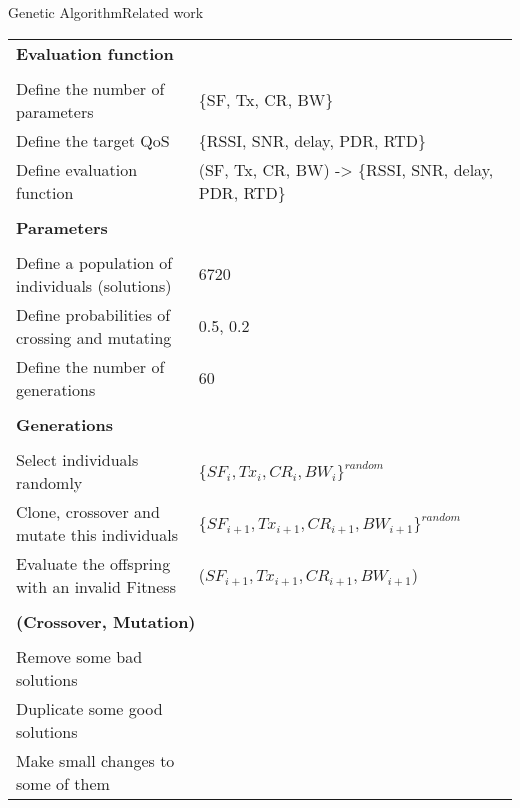 \begin{frame}{Genetic Algorithm}{Related work}
		\begin{tabular}{ll}
			\multicolumn{2}{l}{\textbf{Evaluation function}} \\\\
			Define the number of parameters                       	& \{SF, Tx, CR, BW\} \\
			Define the target QoS			                      	& \{RSSI, SNR, delay, PDR, RTD\} \\
			Define evaluation function                            	& \red{Score}(SF, Tx, CR, BW) -> \{RSSI, SNR, delay, PDR, RTD\} \\\\
			\multicolumn{2}{l}{\textbf{Parameters}} \\\\
			Define a population of individuals (solutions)      	& 6720  \\
			Define probabilities of crossing and mutating       	& 0.5, 0.2 \\ 
			Define the number of generations                   	 	& 60 \\\\
			\multicolumn{2}{l}{\textbf{Generations}} \\\\
			Select individuals randomly    							& \{$SF_{i}, Tx_{i}, CR_{i}, BW_{i}\}^{random}$ 	\\
			Clone, crossover and mutate this individuals 	        & \{$SF_{i+1}, Tx_{i+1}, CR_{i+1}, BW_{i+1}\}^{random}$ \\
			Evaluate the offspring with an invalid Fitness 			& \red{Score}($SF_{i+1}, Tx_{i+1}, CR_{i+1}, BW_{i+1}$) \\\\
			\multicolumn{2}{l}{\textbf{(Crossover, Mutation)}} \\\\
			Remove some bad solutions                                & \\
			Duplicate some good solutions                            & \\
			Make small changes to some of them                       & \\
		\end{tabular}




\end{frame}

